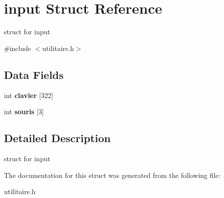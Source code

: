 \hypertarget{structinput}{}\section{input Struct Reference}
\label{structinput}


struct for input  




{\ttfamily \#include $<$utilitaire.\+h$>$}

\subsection*{Data Fields}
\begin{DoxyCompactItemize}
\item 
int {\bfseries clavier} \mbox{[}322\mbox{]}\hypertarget{structinput_a16310d492ad445ab28f8967aa370cbdc}{}\label{structinput_a16310d492ad445ab28f8967aa370cbdc}

\item 
int {\bfseries souris} \mbox{[}3\mbox{]}\hypertarget{structinput_a8c22f8ed0c0b5b39742ed43aaffad224}{}\label{structinput_a8c22f8ed0c0b5b39742ed43aaffad224}

\end{DoxyCompactItemize}


\subsection{Detailed Description}
struct for input 

The documentation for this struct was generated from the following file\+:\begin{DoxyCompactItemize}
\item 
utilitaire.\+h\end{DoxyCompactItemize}
